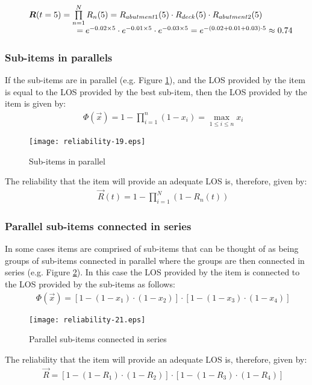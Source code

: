 \begin{eqnarray}
&& \begin{array}{l}
\vec R(t = 5) = \prod\limits_{n = 1}^N {{R_n}(5)}  = {R_{abutment1}}(5) \cdot
{R_{deck}}(5) \cdot {R_{abutment2}}(5)\\
\hspace{20mm}= {e^{ - 0.02 \times 5}} \cdot {e^{ - 0.01 \times 5}} \cdot {e^{ - 0.03 \times
5}} = {e^{ - (0.02 + 0.01 + 0.03) \cdot 5}} \approx 0.74
\end{array}
\end{eqnarray}
\subsubsection{Sub-items in parallels}
If the sub-items are in parallel (e.g. Figure \ref{reliability-19}), and the LOS provided
by the item is equal to the LOS provided by the best sub-item, then the LOS
provided by the item is given by:
\begin{eqnarray}
&& \Phi(\overrightarrow{x})=1-\prod_{i=1}^n (1-x_i)= \max\limits_{1 \leq i \leq n} x_i \label{eqreliability:18}
\end{eqnarray}
\begin{figure}[h]
\texttt{[image: reliability-19.eps]}
\caption{Sub-items in parallel}\label{reliability-19}
\end{figure}
The reliability that the item will provide an adequate LOS is, therefore, given by:
\begin{eqnarray}
&& \vec R(t) = 1 - \prod\limits_{i = 1}^N {\left( {1 - {R_n}(t)} \right)}
\label{eqreliability:19}
\end{eqnarray}
\subsubsection{Parallel sub-items connected in series}
In some cases items are comprised of sub-items that can be thought of as being
groups of sub-items connected in parallel where the groups are then connected in
series (e.g. Figure \ref{reliability-21}). In this case the LOS provided by the item is
connected to the LOS provided by the sub-items as follows:
\begin{eqnarray}
&& \Phi (\vec x) = \left[ {1 - (1 - {x_1}) \cdot (1 - {x_2})} \right] \cdot \left[ {1 - (1
- {x_3}) \cdot (1 - {x_4})} \right]
\label{eqreliability:201}
\end{eqnarray}
\begin{figure}[h]
\texttt{[image: reliability-21.eps]}
\caption{Parallel sub-items connected in series}\label{reliability-21}
\end{figure}
The reliability that the item will provide an adequate LOS is, therefore, given by:
\begin{eqnarray}
&& \vec R = \left[ {1 - (1 - {R_1}) \cdot (1 - {R_2})} \right] \cdot \left[ {1 - (1
- {R_3}) \cdot (1 - {R_4})} \right]
\label{eqreliability:20}
\end{eqnarray}
